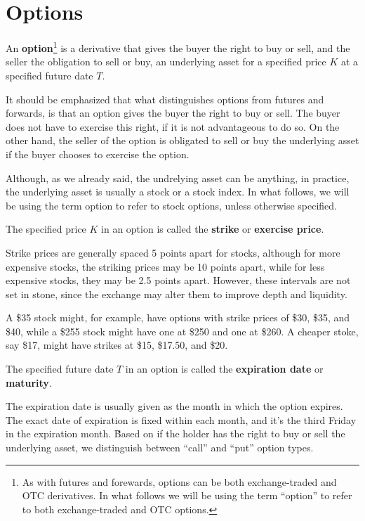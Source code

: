 \section{Options}

\bd[Option]
An \textbf{option}\footnote{As with futures and forewards, options can be both exchange-traded and OTC derivatives. In
what follows we will be using the term ``option'' to refer to both exchange-traded and OTC options.} is a derivative
that gives the buyer the right to buy or sell, and the seller the obligation to sell or buy, an underlying asset for a
specified price $K$ at a specified future date $T$.
\ed

It should be emphasized that what distinguishes options from futures and forwards, is that an option gives the buyer
the right to buy or sell. The buyer does not have to exercise this right, if it is not advantageous to do so. On the
other hand, the seller of the option is obligated to sell or buy the underlying asset if the buyer chooses to exercise
the option.

Although, as we already said, the undrelying asset can be anything, in practice, the underlying asset is usually a
stock or a stock index. In what follows, we will be using the term option to refer to stock options, unless otherwise
specified.

The specified price $K$ in an option is called the \textbf{strike} or \textbf{exercise price}.
\ed

Strike prices are generally spaced 5 points apart for stocks, although for more expensive stocks, the striking prices
may be 10 points apart, while for less expensive stocks, they may be 2.5 points apart. However, these intervals are not
set in stone, since the exchange may alter them to improve depth and liquidity.

\be
A \$35 stock might, for example, have options with strike prices of \$30, \$35, and \$40, while a \$255 stock might
have one at \$250 and one at \$260. A cheaper stoke, say \$17, might have strikes at \$15, \$17.50, and \$20.
\ee

The specified future date $T$ in an option is called the \textbf{expiration date} or \textbf{maturity}.
\ed

The expiration date is usually given as the month in which the option expires. The exact date of expiration is fixed
within each month, and it's the third Friday in the expiration month. \v

Based on if the holder has the right to buy or sell the underlying asset, we distinguish between ``call'' and ``put''
option types.

